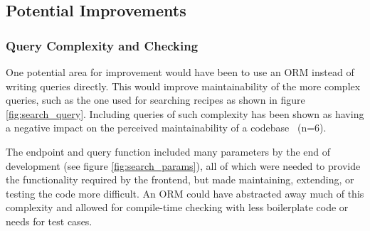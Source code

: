 \subsection{Potential Improvements}

\subsubsection{Query Complexity and Checking}\label{sec:search_complexity}
One potential area for improvement would have been to use an ORM instead of
writing queries directly. This would improve maintainability of the more complex
queries, such as the one used for searching recipes as shown in figure \ref{fig:search_query}.
Including queries of such complexity has been shown as having a negative impact on the perceived
maintainability of a codebase~\cite{yamashita_code_2012} (n=6).

The endpoint and query function included many parameters by the end of development
(see figure \ref{fig:search_params}), all of which were needed to provide the functionality
required by the frontend, but made maintaining, extending, or testing the code more difficult.
An ORM could have abstracted away much of this complexity and allowed for compile-time checking
with less boilerplate code or needs for test cases.
